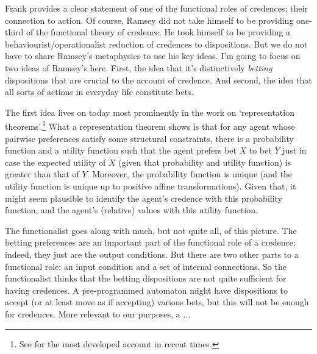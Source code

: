 Frank \cite{Ramsey1931} provides a clear statement of one of the functional roles of credences; their connection to action. Of course, Ramsey did not take himself to be providing one-third of the functional theory of credence. He took himself to be providing a behaviourist/operationalist reduction of credences to dispositions. But we do not have to share Ramsey's metaphysics to use his key ideas. I'm going to focus on two ideas of Ramsey's here. First, the idea that it's distinctively \textit{betting} dispositions that are crucial to the account of credence. And second, the idea that all sorts of actions in everyday life constitute bets.

The first idea lives on today most prominently in the work on `representation theorems'.\footnote{See \cite{Maher1993} for the most developed account in recent times.} What a representation theorem shows is that for any agent whose pairwise preferences satisfy some structural constraints, there is a probability function and a utility function such that the agent prefers bet \(X\) to bet \(Y\) just in case the expected utility of \(X\) (given that probability and utility function) is greater than that of \(Y\). Moreover, the probability function is unique (and the utility function is unique up to positive affine transformations). Given that, it might seem plausible to identify the agent's credence with this probability function, and the agent's (relative) values with this utility function.

The functionalist goes along with much, but not quite all, of this picture. The betting preferences are an important part of the functional role of a credence; indeed, they just are the output conditions. But there are two other parts to a functional role: an input condition and a set of internal connections. So the functionalist thinks that the betting dispositions are not quite sufficient for having credences. A pre-programmed automaton might have dispositions to accept (or at least move as if accepting) various bets, but this will not be enough for credences. More relevant to our purposes, a ...







